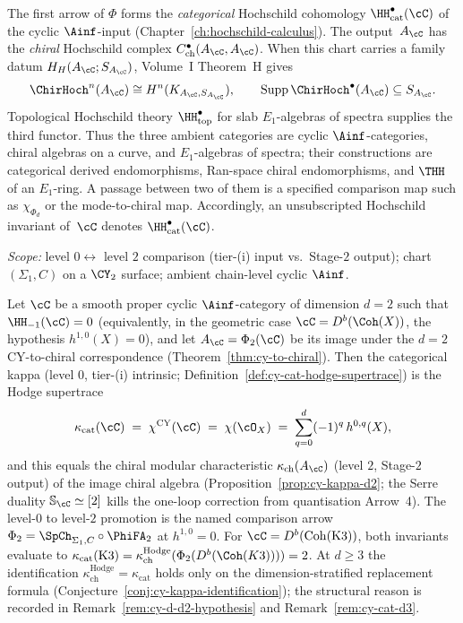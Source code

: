 \begin{remark}
\label{rem:cyclic-ainf-three-hochschild}
The first arrow of $\Phi$ forms the \emph{categorical} Hochschild
cohomology $\HH^\bullet_{\mathrm{cat}}(\cC)$ of the cyclic
$\Ainf$-input (Chapter~\textup{\ref{ch:hochschild-calculus}}). The
output~$A_\cC$ has the \emph{chiral} Hochschild complex
$C^\bullet_{\mathrm{ch}}(A_\cC,A_\cC)$. When this chart carries a
family datum $H_H(A_\cC;S_{A_\cC})$, Volume~I Theorem~H gives
\[
 \ChirHoch^n(A_\cC)\cong H^n(K_{A_\cC,S_{A_\cC}}),
 \qquad
 \operatorname{Supp}\ChirHoch^\bullet(A_\cC)
 \subseteq S_{A_\cC}.
\]
Topological Hochschild theory $\HH^\bullet_{\mathrm{top}}$ for slab
$E_1$-algebras of spectra supplies the third functor. Thus the three
ambient categories are cyclic $\Ainf$-categories, chiral algebras on
a curve, and $E_1$-algebras of spectra; their constructions are
categorical derived endomorphisms, Ran-space chiral endomorphisms, and
$\THH$ of an $E_1$-ring. A passage between two of them is a specified
comparison map such as $\chi_{\Phi_d}$ or the mode-to-chiral map.
Accordingly, an unsubscripted Hochschild invariant of~$\cC$ denotes
$\HH^\bullet_{\mathrm{cat}}(\cC)$.
\end{remark}

\begin{theorem}[Cyclic \texorpdfstring{$\Ainf$}{A-inf} input determines \texorpdfstring{$\kappa_{\mathrm{cat}}$}{kappa-cat} at \texorpdfstring{$d = 2$}{d = 2}, \texorpdfstring{$h^{1,0} = 0$}{h-1,0 = 0}]
\label{thm:cyclic-ainf-kappa-cat-d2}
\textsl{Scope:} level $0 \leftrightarrow$ level $2$ comparison
(tier-(i) input vs.\ Stage-$2$ output); chart $(\Sigma_1, C)$ on a
$\CY_2$ surface; ambient chain-level cyclic $\Ainf$.

Let $\cC$ be a smooth proper cyclic $\Ainf$-category of dimension $d = 2$ such that $\HH_{-1}(\cC) = 0$ (equivalently, in the geometric case $\cC = D^b(\Coh(X))$, the hypothesis $h^{1,0}(X) = 0$), and let $A_\cC = \Phi_2(\cC)$ be its image under the $d = 2$ CY-to-chiral correspondence (Theorem~\ref{thm:cy-to-chiral}). Then the categorical kappa (level $0$, tier-(i) intrinsic; Definition~\ref{def:cy-cat-hodge-supertrace}) is the Hodge supertrace
\[
 \kappa_{\mathrm{cat}}(\cC) \;=\; \chi^{\mathrm{CY}}(\cC) \;=\; \chi(\cO_X) \;=\; \sum_{q=0}^{d} (-1)^q\, h^{0,q}(X),
\]
and this equals the chiral modular characteristic $\kappa_{\mathrm{ch}}(A_\cC)$ (level $2$, Stage-$2$ output) of the image chiral algebra (Proposition~\ref{prop:cy-kappa-d2}; the Serre duality $\mathbb{S}_\cC \simeq [2]$ kills the one-loop correction from quantisation Arrow~4). The level-$0$ to level-$2$ promotion is the named comparison arrow $\Phi_2 = \SpCh_{\Sigma_1, C} \circ \PhiFA_2$ at $h^{1,0} = 0$. For $\cC = D^b(\mathrm{Coh}(\mathrm{K3}))$, both invariants evaluate to
$\kappa_{\mathrm{cat}}(\mathrm{K3}) = \kappa_{\mathrm{ch}}^{\mathrm{Hodge}}(\Phi_2(D^b(\Coh(K3)))) = 2$.
At $d \geq 3$ the identification $\kappa_{\mathrm{ch}}^{\mathrm{Hodge}} = \kappa_{\mathrm{cat}}$
holds only on the dimension-stratified replacement formula
(Conjecture~\ref{conj:cy-kappa-identification}); the structural reason
is recorded in Remark~\ref{rem:cy-d-d2-hypothesis} and
Remark~\ref{rem:cy-cat-d3}.
\end{theorem}

